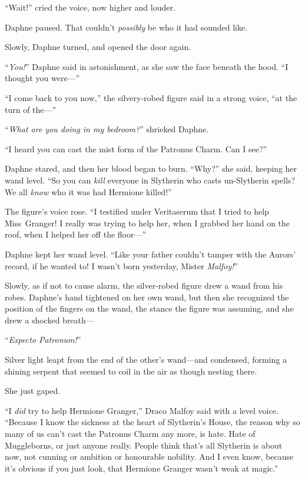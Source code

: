 “Wait!” cried the voice, now higher and louder.

Daphne paused. That couldn’t \emph{possibly} be who it had sounded like.

Slowly, Daphne turned, and opened the door again.

“\emph{You!}” Daphne said in astonishment, as she saw the face beneath the hood. “I thought you were—”

“I come back to you now,” the silvery-robed figure said in a strong voice, “at the turn of the—”

“\emph{What are you doing in my bedroom?}” shrieked Daphne.

“I heard you can cast the mist form of the Patronus Charm. Can I see?”

Daphne stared, and then her blood began to burn. “Why?” she said, keeping her wand level. “So you can \emph{kill} everyone in Slytherin who casts un-Slytherin spells? We all \emph{know} who it was had Hermione killed!”

The figure’s voice rose. “I testified under Veritaserum that I tried to help Miss~Granger! I really was trying to help her, when I grabbed her hand on the roof, when I helped her off the floor—”

Daphne kept her wand level. “Like your father couldn’t tamper with the Aurors’ record, if he wanted to! I wasn’t born yesterday, Mister \emph{Malfoy!}”

Slowly, as if not to cause alarm, the silver-robed figure drew a wand from his robes. Daphne’s hand tightened on her own wand, but then she recognized the position of the fingers on the wand, the stance the figure was assuming, and she drew a shocked breath—

“\emph{Expecto Patronum!}”

Silver light leapt from the end of the other’s wand—and condensed, forming a shining serpent that seemed to coil in the air as though nesting there.

She just gaped.

“I \emph{did} try to help Hermione Granger,” Draco Malfoy said with a level voice. “Because I know the sickness at the heart of Slytherin’s House, the reason why so many of us can’t cast the Patronus Charm any more, is hate. Hate of Muggleborns, or just anyone really. People think that’s all Slytherin is about now, not cunning or ambition or honourable nobility. And I even know, because it’s obvious if you just look, that Hermione Granger wasn’t weak at magic.”

